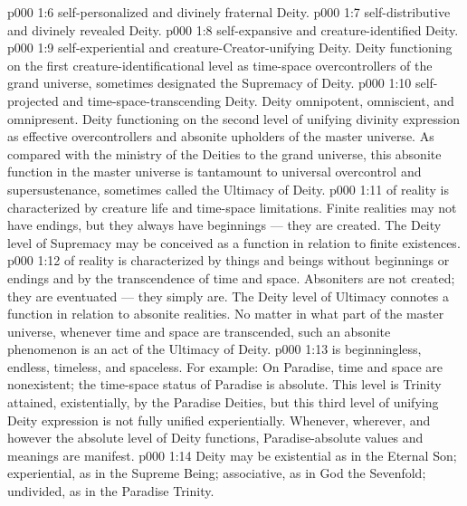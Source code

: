 \vs p000 1:6 \bibnobreakspace {} self\hyp{}personalized and divinely fraternal Deity.
\vs p000 1:7 \bibnobreakspace {} self\hyp{}distributive and divinely revealed Deity.
\vs p000 1:8 \bibnobreakspace {} self\hyp{}expansive and creature\hyp{}identified Deity.
\vs p000 1:9 \bibnobreakspace {} self\hyp{}experiential and creature\hyp{}Creator\hyp{}unifying Deity. Deity functioning on the first creature\hyp{}identificational level as time\hyp{}space overcontrollers of the grand universe, sometimes designated the Supremacy of Deity.
\vs p000 1:10 \bibnobreakspace {} self\hyp{}projected and time\hyp{}space\hyp{}transcending Deity. Deity omnipotent, omniscient, and omnipresent. Deity functioning on the second level of unifying divinity expression as effective overcontrollers and absonite upholders of the master universe. As compared with the ministry of the Deities to the grand universe, this absonite function in the master universe is tantamount to universal overcontrol and supersustenance, sometimes called the Ultimacy of Deity.
\vs p000 1:11 \pc {} of reality is characterized by creature life and time\hyp{}space limitations. Finite realities may not have endings, but they always have beginnings --- they are created. The Deity level of Supremacy may be conceived as a function in relation to finite existences.
\vs p000 1:12 \pc {} of reality is characterized by things and beings without beginnings or endings and by the transcendence of time and space. Absoniters are not created; they are eventuated --- they simply are. The Deity level of Ultimacy connotes a function in relation to absonite realities. No matter in what part of the master universe, whenever time and space are transcended, such an absonite phenomenon is an act of the Ultimacy of Deity.
\vs p000 1:13 \pc {} is beginningless, endless, timeless, and spaceless. For example: On Paradise, time and space are nonexistent; the time\hyp{}space status of Paradise is absolute. This level is Trinity attained, existentially, by the Paradise Deities, but this third level of unifying Deity expression is not fully unified experientially. Whenever, wherever, and however the absolute level of Deity functions, Paradise\hyp{}absolute values and meanings are manifest.
\vs p000 1:14 \pc Deity may be existential as in the Eternal Son; experiential, as in the Supreme Being; associative, as in God the Sevenfold; undivided, as in the Paradise Trinity.
